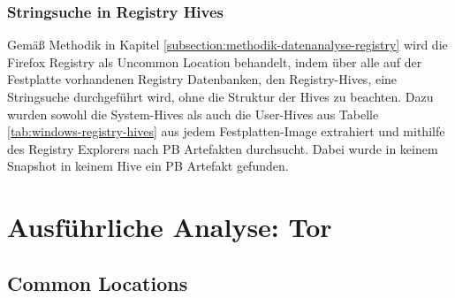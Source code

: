 \begin{appendices}
		\subsubsection*{Stringsuche in Registry Hives}
		Gemäß Methodik in Kapitel \ref{subsection:methodik-datenanalyse-registry} wird die Firefox Registry als Uncommon Location behandelt, indem über alle auf der Festplatte vorhandenen Registry Datenbanken, den Registry-Hives, eine Stringsuche durchgeführt wird, ohne die Struktur der Hives zu beachten. 
		Dazu wurden sowohl die System-Hives als auch die User-Hives aus Tabelle \ref{tab:windows-registry-hives} aus jedem Festplatten-Image extrahiert und mithilfe des Registry Explorers nach PB Artefakten durchsucht.
		Dabei wurde in keinem Snapshot in keinem Hive ein PB Artefakt gefunden.
		
		
		
		
		\section{Ausführliche Analyse: Tor}
		
		\subsection{Common Locations}
		\label{subsection:appendix-tor-common-locations}

\end{appendices}
